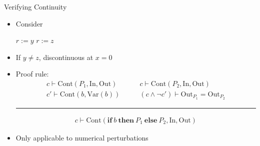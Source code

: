 \documentclass[usenames,dvipsnames]{beamer}
\begin{document}
\begin{frame}[fragile]{Verifying Continuity}
    \begin{itemize}
        \item<1-> Consider
            \begin{algorithmic}[1]
                    \State \(r := y\)
                \Else
                    \State \(r := z\)
                \EndIf
            \end{algorithmic}
        \item<2-> If \(y \not= z\), discontinuous at \(x = 0\)
        \item<3-> Proof rule:
            \begin{align*}
                c \vdash \mathrm{Cont}(P_{1}, \mathrm{In}, \mathrm{Out}) &\qquad c \vdash \mathrm{Cont}(P_{2}, \mathrm{In}, \mathrm{Out})\\
                c' \vdash \mathrm{Cont}(b, \mathrm{Var}(b)) &\qquad (c \wedge \neg c') \vdash \mathrm{Out}_{P_{1}} = \mathrm{Out}_{P_{2}}
            \end{align*}
            \vspace{-2\baselineskip}
            \begin{center}
                \rule{0.85\textwidth}{0.5pt}
            \end{center}
            \vspace{-0.75\baselineskip}
            \begin{align*}
                c \vdash \mathrm{Cont}(\mathbf{if}\: b\: \mathbf{then}\: P_{1}\: \mathbf{else}\: P_{2}, \mathrm{In}, \mathrm{Out})
            \end{align*}
        \item<4-> Only applicable to numerical perturbations
    \end{itemize}
\end{frame}
\end{document}
